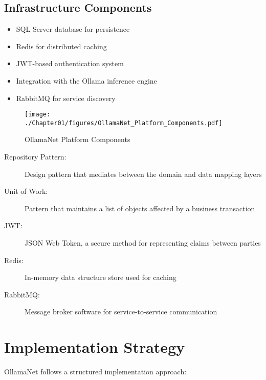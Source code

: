 \subsection{Infrastructure Components}
\begin{itemize}
    \item SQL Server database for persistence
    \item Redis for distributed caching
    \item JWT-based authentication system
    \item Integration with the Ollama inference engine
    \item RabbitMQ for service discovery
\end{itemize}

\begin{sidewaysfigure}[p]
    \centering
    \texttt{[image: ./Chapter01/figures/OllamaNet\_Platform\_Components.pdf]}
    \caption{OllamaNet Platform Components}
    \label{fig:ollamanet-platform-components}
\end{sidewaysfigure}
\clearpage

\begin{terminology}
\begin{description}
    \item[Repository Pattern:] Design pattern that mediates between the domain and data mapping layers
    \item[Unit of Work:] Pattern that maintains a list of objects affected by a business transaction
    \item[JWT:] JSON Web Token, a secure method for representing claims between parties
    \item[Redis:] In-memory data structure store used for caching
    \item[RabbitMQ:] Message broker software for service-to-service communication
\end{description}
\end{terminology}

\section{Implementation Strategy}

OllamaNet follows a structured implementation approach:

